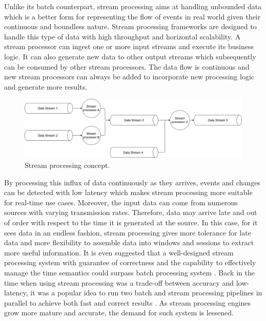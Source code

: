 Unlike its batch counterpart, stream processing aims at handling unbounded data which is a better form for representing the flow of events in real world given their continuous and boundless nature. Stream processing frameworks are designed to handle this type of data with high throughput and horizontal scalability. A stream processor can ingest one or more input streams and execute its business logic. It can also generate new data to other output streams which subsequently can be consumed by other stream processors. The data flow is continuous and new stream processors can always be added to incorporate new processing logic and generate more results.

\begin{figure}[h]
	\includegraphics[width=\linewidth]{images/streamprocessing.png}
	\caption{Stream processing concept.}
	\label{fig:streamprocessing}
\end{figure}


By processing this influx of data continuously as they arrives, events and changes can be detected with low latency which makes stream processing more suitable for real-time use cases. Moreover, the input data can come from numerous sources with varying transmission rates. Therefore, data may arrive late and out of order with respect to the time it is generated at the source. In this case, for it sees data in an endless fashion, stream processing gives more tolerance for late data and more flexibility to assemble data into windows and sessions to extract more useful information. It is even suggested that a well-designed stream processing system with guarantee of correctness and the capability to effectively manage the time semantics could surpass batch processing system \cite{stream101}. Back in the time when using stream processing was a trade-off between accuracy and low-latency, it was a popular idea to run two batch and stream processing pipelines in parallel to achieve both fast and correct results \cite{questionlambdaarchitecture}. As stream processing engines grow more mature and accurate, the demand for such system is lessened.
